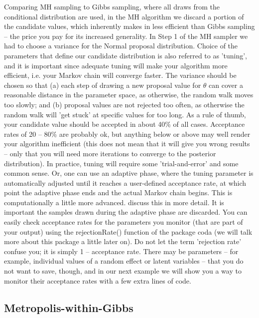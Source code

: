 Comparing MH sampling to Gibbs sampling, where all draws from the conditional distribution are used, in the MH algorithm we discard a portion of the candidate values, which inherently makes in less efficient than Gibbs sampling – the price you pay for its increased generality.
In Step 1 of the MH sampler we had to choose a variance for the Normal proposal distribution. Choice of the parameters that define our candidate distribution is also referred to as 'tuning', and it is important since adequate tuning will make your algorithm more efficient, i.e. your Markov chain will converge faster. The variance should be chosen so that (a) each step of drawing a new proposal value for $\theta$ can cover a reasonable distance in the parameter space, as otherwise, the random walk moves too slowly; and (b) proposal values are not rejected too often, as otherwise the random walk will 'get stuck' at specific values for too long.  As a rule of thumb, your candidate value should be accepted in about 40\% of all cases. Acceptance rates of 20 – 80\% are probably ok, but anything below or above may well render your algorithm inefficient (this does not mean that it will give you wrong results – only that you will need more iterations to converge to the posterior distribution). In practice, tuning will require some 'trial-and-error' and some common sense. Or, one can use an adaptive phase, where the tuning parameter is automatically adjusted until it reaches a user-defined acceptance rate, at which point the adaptive phase ends and the actual Markov chain begins. This is computationally a little more advanced. \citet{link_barker:2009} discuss this in more detail. It is important the samples drawn during the adaptive phase are discarded.
You can easily check acceptance rates for the parameters you monitor (that are part of your output) using the rejectionRate() function of the package coda (we will talk more about this package a little later on). Do not let the term 'rejection rate' confuse you; it is simply 1 – acceptance rate. There may be parameters – for example, individual values of a random effect or latent variables – that you do not want to save, though, and in our next example we will show you a way to monitor their acceptance rates with a few extra lines of code.

\subsection{ Metropolis-within-Gibbs }

